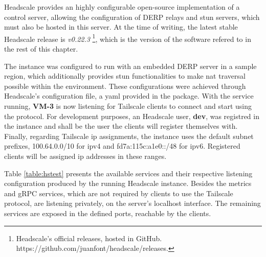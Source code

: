 \documentclass[11pt,twoside,a4paper]{report}
\begin{document}
Headscale provides an highly configurable open-source implementation of a control server, allowing the configuration of \ac{DERP} relays and \ac{stun} servers, which must also be hosted in this server. At the time of writing, the latest stable Headscale release is \emph{v0.22.3} \footnote{Headscale's official releases, hosted in GitHub. https://github.com/juanfont/headscale/releases.}, which is the version of the software refered to in the rest of this chapter.

The instance was configured to run with an embedded \ac{DERP} server in a sample region, which additionally provides \ac{stun} functionalities to make \ac{nat} traversal possible within the environment. These configurations were achieved through Headscale's configuration file, a yaml provided in the package. With the service running, \textbf{VM-3} is now listening for Tailscale clients to connect and start using the protocol. For development purposes, an Headscale user, \textbf{dev}, was registred in the instance and shall be the user the clients will register themselves with. Finally, regarding Tailscale \ac{ip} assignments, the instance uses the default subnet prefixes, 100.64.0.0/10 for ipv4 and fd7a:115c:a1e0::/48 for ipv6. Registered clients will be assigned \ac{ip} addresses in these ranges.

Table \ref{table:hstest} presents the available services and their respective listening configuration produced by the running Headscale instance. Besides the metrics and gRPC services, which are not required by clients to use the Tailscale protocol, are listening privately, on the server's localhost interface. The remaining services are exposed in the defined ports, reachable by the clients.

\begin{table}[]
\centering
{}
\caption{Services running in the Headscale instance}
\label{table:hstest}
\end{table}
\end{document}
